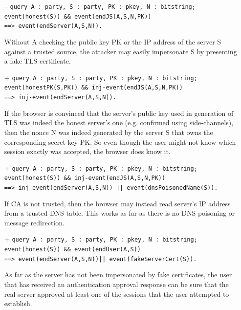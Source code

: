 \begin{itemize}

\item[--] \texttt{query A : party, S : party, PK : pkey, N : bitstring;\\
                  event(honest(S)) \&\& event(endJS(A,S,N,PK))\\
                  ==> event(endServer(A,S,N)).}

Without A checking the public key PK or the IP address of the server S against a trusted source, the attacker may easily impersonate S by presenting a fake TLS certificate.

\item[+] \texttt{query A : party, S : party, PK : pkey, N : bitstring;\\
                 event(honestPK(S,PK)) \&\& inj-event(endJS(A,S,N,PK))\\
                 ==> inj-event(endServer(A,S,N)).}

If the browser is convinced that the server's public key used in generation of TLS was indeed the honest server's one (e.g. confirmed using side-channels), then the nonce N was indeed generated by the server S that owns the corresponding secret key PK. So even though the user might not know which session exactly was accepted, the browser does know it.

\item[+] \texttt{query A : party, S : party, PK : pkey, N : bitstring;\\
                 event(honest(S)) \&\& inj-event(endJS(A,S,N,PK))\\
                 ==> inj-event(endServer(A,S,N)) || event(dnsPoisonedName(S)).}

If CA is not trusted, then the browser may instead read server's IP address from a trusted DNS table. This works as far as there is no DNS poisoning or message redirection.

\item[+] \texttt{query A : party, S : party, PK : pkey, N : bitstring;\\
                 event(honest(S)) \&\& event(endUser(A,S))\\
                 ==> event(endServer(A,S,N))|| event(fakeServerCert(S)).}

As far as the server has not been impersonated by fake certificates, the user that has received an authentication approval response can be sure that the real server approved at least one of the sessions that the user attempted to establish.


\end{itemize}
